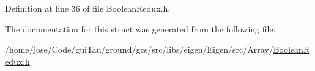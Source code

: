 Definition at line 36 of file Boolean\-Redux.\-h.



The documentation for this struct was generated from the following file\-:\begin{DoxyCompactItemize}
\item 
/home/jose/\-Code/gui\-Tau/ground/gcs/src/libs/eigen/\-Eigen/src/\-Array/\hyperlink{_boolean_redux_8h}{Boolean\-Redux.\-h}\end{DoxyCompactItemize}

